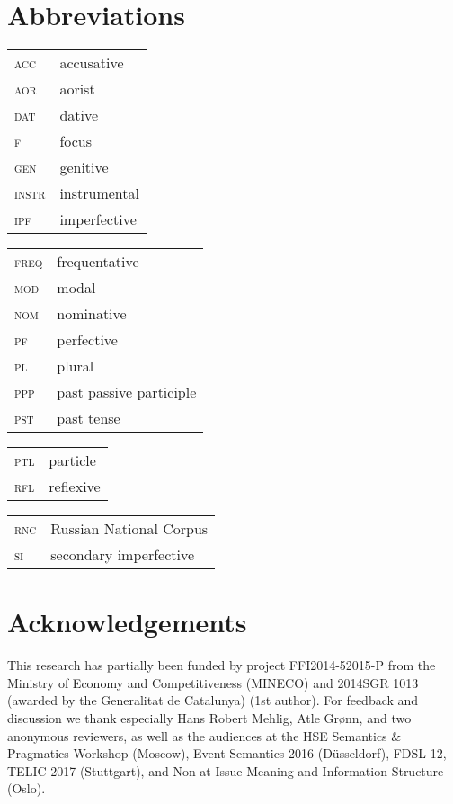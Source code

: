 \documentclass[output=paper,modfonts,newtxmath,hidelinks
\ChapterDOI{10.5281/zenodo.2545513}
]{langscibook}
\begin{document}
\largerpage[2]
\section*{Abbreviations}

\begin{tabularx}{.5\textwidth}{@{}lQ@{}}
\textsc{acc}&{accusative}\\
\textsc{aor}&aorist\\
\textsc{dat}&{dative}\\
\textsc{f}&focus\\
\textsc{gen}&{genitive}\\
\textsc{instr}&{instrumental}\\
\textsc{ipf}&{imperfective}\\
\end{tabularx}%
\begin{tabularx}{.5\textwidth}{@{}lQ@{}}
\textsc{freq}&frequentative\\
\textsc{mod}&modal\\
\textsc{nom}&{nominative}\\
\textsc{pf}&{perfective}\\
\textsc{pl}&{plural}\\
\textsc{ppp}&past passive {participle}\\
\textsc{pst}&{past tense}\\
\end{tabularx}%

\begin{tabularx}{.5\textwidth}{@{}lQ@{}}
\textsc{ptl}&particle\\
\textsc{rfl}&reflexive\\
\end{tabularx}%
\begin{tabularx}{.5\textwidth}{@{}lQ@{}}
\textsc{rnc}&{Russian} National Corpus\\
\textsc{si}&secondary {imperfective}\\
\end{tabularx}


\section*{Acknowledgements}

This research has partially been funded by project FFI2014-52015-P from the Ministry of Economy and Competitiveness (MINECO) and 2014SGR 1013 (awarded by the Generalitat de Catalunya) (1st author). For feedback and discussion we thank especially Hans Robert Mehlig, Atle Grønn, and  two anonymous reviewers, as well as the audiences at the HSE Semantics \& Pragmatics Workshop (Moscow), Event Semantics 2016 (D\"{u}sseldorf), FDSL 12, TELIC 2017 (Stuttgart), and Non-at-Issue Meaning and Information Structure (Oslo).

\largerpage
\sloppy\printbibliography[heading=subbibliography,notkeyword=this]
\end{document}
